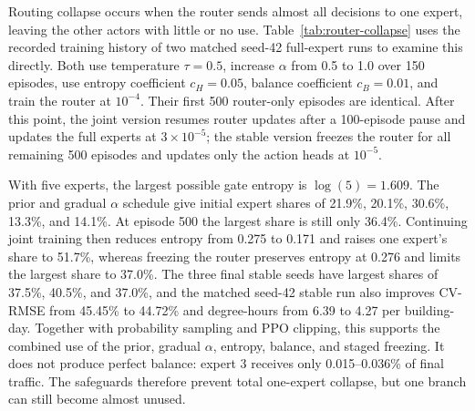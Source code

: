 Routing collapse occurs when the router sends almost all decisions to one
expert, leaving the other actors with little or no use. Table~\ref{tab:router-collapse}
uses the recorded training history of two matched seed-42 full-expert runs to
examine this directly. Both use temperature $\tau=0.5$, increase $\alpha$ from
0.5 to 1.0 over 150 episodes, use entropy coefficient $c_H=0.05$, balance
coefficient $c_B=0.01$, and train the router at $10^{-4}$. Their first 500
router-only episodes are identical. After this point, the joint version resumes
router updates after a 100-episode pause and updates the full experts at
$3\times10^{-5}$; the stable version freezes the router for all remaining 500
episodes and updates only the action heads at $10^{-5}$.

\begin{table}[!htbp]
\scriptsize
\begin{center}
\end{center}
\caption{Matched seed-42 routing-concentration data. Higher entropy and lower
largest-gate/share values indicate less concentration.}
\label{tab:router-collapse}
\end{table}

With five experts, the largest possible gate entropy is $\log(5)=1.609$. The
prior and gradual $\alpha$ schedule give initial expert shares of 21.9\%,
20.1\%, 30.6\%, 13.3\%, and 14.1\%. At episode 500 the largest share is still
only 36.4\%. Continuing joint training then reduces entropy from 0.275 to 0.171
and raises one expert's share to 51.7\%, whereas freezing the router preserves
entropy at 0.276 and limits the largest share to 37.0\%. The three final stable
seeds have largest shares of 37.5\%, 40.5\%, and 37.0\%, and the matched seed-42
stable run also improves CV-RMSE from 45.45\% to 44.72\% and degree-hours from
6.39 to 4.27 per building-day. Together with probability sampling and PPO
clipping, this supports the combined use of the prior, gradual $\alpha$,
entropy, balance, and staged
freezing. It does not produce perfect balance: expert 3 receives only
0.015--0.036\% of final traffic. The safeguards therefore prevent total
one-expert collapse, but one branch can still become almost unused.


